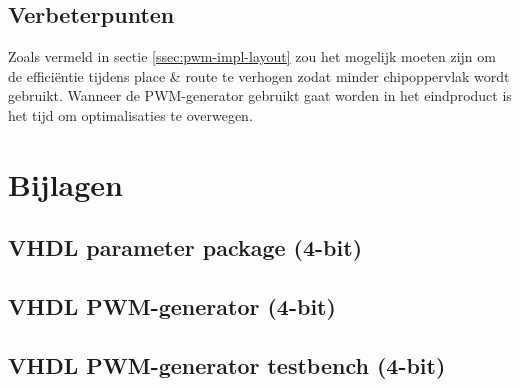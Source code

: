 \documentclass{article}
\begin{document}
\subsection{Verbeterpunten}
\label{ssec:pwm-conclusie-verb}
Zoals vermeld in sectie \ref{ssec:pwm-impl-layout} zou het mogelijk moeten zijn om de efficiëntie tijdens place \& route te verhogen zodat minder chipoppervlak wordt gebruikt. Wanneer de PWM-generator gebruikt gaat worden in het eindproduct is het tijd om optimalisaties te overwegen.

\section{Bijlagen}
\label{sec:pwm-bijlagen}

\subsection{VHDL parameter package (4-bit)}
\label{vhdl:pwm-gen-pack}

\subsection{VHDL PWM-generator (4-bit)}
\label{vhdl:pwm-gen}

\subsection{VHDL PWM-generator testbench (4-bit)}
\label{vhdl:pwm-gen-tb}
\end{document}
